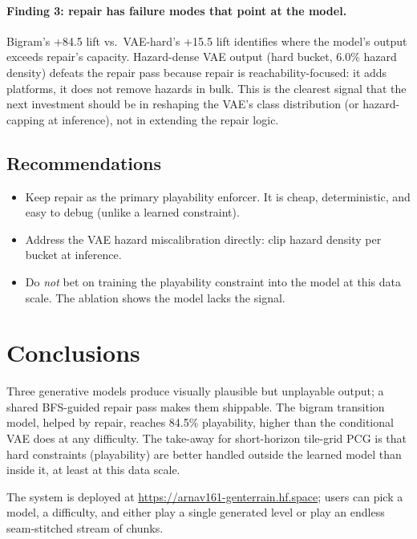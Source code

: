 \documentclass[11pt]{article}
\begin{document}
\paragraph{Finding 3: repair has failure modes that point at the model.}
Bigram's +84.5 lift vs.\ VAE-hard's +15.5 lift identifies where the
model's output exceeds repair's capacity. Hazard-dense VAE output
(hard bucket, 6.0\% hazard density) defeats the repair pass because
repair is reachability-focused: it adds platforms, it does not remove
hazards in bulk. This is the clearest signal that the next investment
should be in reshaping the VAE's class distribution (or hazard-capping
at inference), not in extending the repair logic.

\subsection{Recommendations}
\begin{itemize}
    \item Keep repair as the primary playability enforcer. It is
    cheap, deterministic, and easy to debug (unlike a learned
    constraint).
    \item Address the VAE hazard miscalibration directly: clip hazard
    density per bucket at inference.
    \item Do \emph{not} bet on training the playability constraint
    into the model at this data scale. The ablation shows the model
    lacks the signal.
\end{itemize}

\section{Conclusions}

Three generative models produce visually plausible but unplayable
output; a shared BFS-guided repair pass makes them shippable. The
bigram transition model, helped by repair, reaches 84.5\% playability,
higher than the conditional VAE does at any difficulty. The
take-away for short-horizon tile-grid PCG is that hard constraints
(playability) are better handled outside the learned model than
inside it, at least at this data scale.

The system is deployed at \url{https://arnav161-genterrain.hf.space};
users can pick a model, a difficulty, and either play a single
generated level or play an endless seam-stitched stream of chunks.
\end{document}

